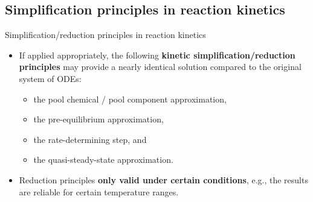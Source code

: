 \subsection{Simplification principles in reaction kinetics}
%
\begin{frame}{Simplification/reduction principles in reaction kinetics}
	\begin{itemize}
		\item  If applied appropriately, the following \alert{\bf kinetic simplification/reduction principles} may provide a nearly identical
		solution compared to the original system of ODEs:
		\begin{itemize}
			\item the pool chemical / pool component  approximation, 
			\item the pre-equilibrium approximation, 
			\item the rate-determining step, and 
			\item  the quasi-steady-state approximation.
		\end{itemize}
		\pause
		\item Reduction principles \alert{\bf only valid under certain conditions}, e.g., the results are reliable for certain temperature ranges.
	\end{itemize}
\end{frame}
%
%
